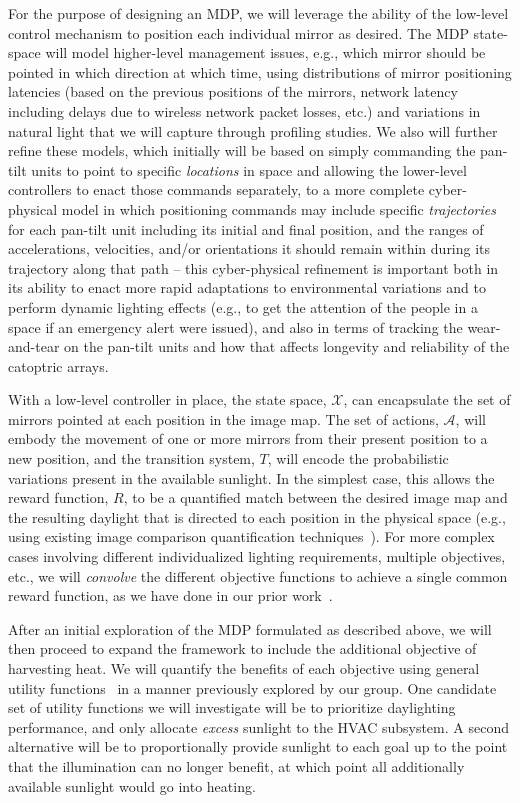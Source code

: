 For the purpose of designing an MDP, we will leverage the ability of the low-level
control mechanism to position each individual mirror as desired.  The MDP state-space 
will model higher-level management issues, e.g., which mirror should be pointed in which 
direction at which time, using distributions of mirror positioning latencies (based on 
the previous positions of the mirrors, network latency including delays due to wireless
network packet losses, etc.) and variations in natural light that we will capture 
through profiling studies.  We also will further refine these models, which initially 
will be based on simply commanding the pan-tilt units to point to specific 
\emph{locations} in space and allowing the lower-level controllers to enact those 
commands separately, to a more complete cyber-physical model in which positioning 
commands may include specific \emph{trajectories} for each pan-tilt unit including 
its initial and final position, and the ranges of accelerations, velocities, and/or 
orientations it should remain within during its trajectory along that path -- this 
cyber-physical refinement is important both in its ability to enact more rapid 
adaptations to environmental variations and to perform dynamic lighting effects 
(e.g., to get the attention of the people in a space if an emergency alert were 
issued), and also in terms of tracking the wear-and-tear on the pan-tilt units and 
how that affects longevity and reliability of the catoptric arrays.

With a low-level controller in place, the state space, $\mathcal{X}$,
can encapsulate the set of mirrors pointed at each position in
the image map.  The set of actions, $\mathcal{A}$, will embody the movement
of one or more mirrors from their present position to a new position,
and the transition system, $T$, will encode the probabilistic variations
present in the available sunlight.  In the simplest case, this allows the 
reward function, $R$, to be a quantified match between the desired image 
map and the resulting daylight that is directed to each position in the 
physical space (e.g., using existing image comparison quantification 
techniques~\cite{ds99,my09,wbo97}).
For more complex cases involving different individualized lighting requirements,
multiple objectives, etc., we will \emph{convolve} the different objective
functions to achieve a single common reward function, as we have done
in our prior work~\cite{tblwgs11,tggs10}.

After an initial exploration of the MDP formulated as described above,
we will then proceed to expand the framework to include the additional
objective of harvesting heat.  We will quantify the benefits of each
objective using general utility functions~\cite{tggs10} in a manner previously
explored by our group. One candidate set of utility functions we will
investigate will be to prioritize daylighting performance, and only
allocate \emph{excess} sunlight to the HVAC subsystem. A second alternative
will be to proportionally provide sunlight to each goal up to the point
that the illumination can no longer benefit, at which point all additionally
available sunlight would go into heating.

